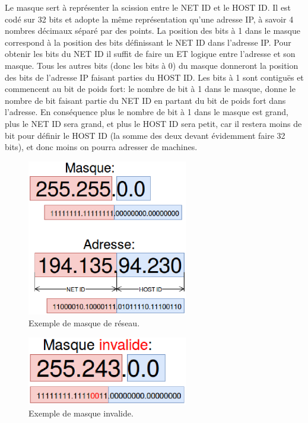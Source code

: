 Le masque sert à représenter la scission entre le NET ID et le HOST ID.
Il est codé sur 32 bits et adopte la même représentation qu'une adresse IP, à savoir
4 nombres décimaux séparé par des points.
La position des bits à 1 dans le masque correspond à la position des bits définissant le NET ID dans l'adresse IP.
Pour obtenir les bits du NET ID il suffit de faire un ET logique entre l'adresse et son masque. Tous les autres bits (donc les bits à 0) du masque donneront la position des bits de l'adresse IP faisant parties du HOST ID.
Les bits à 1 sont contiguës et commencent au bit de poids fort: le nombre de bit à 1 dans le masque, donne
le nombre de bit faisant partie du NET ID en partant du bit de poids fort dans l'adresse.
\smallbreak
En conséquence plus le nombre de bit à 1 dans le masque est grand, plus le NET ID sera grand, et plus le HOST ID sera petit, car il restera moins de bit pour définir le HOST ID (la somme des deux devant évidemment faire 32 bits), et donc moins on pourra adresser de machines.

\begin{figure}[h]
\centering
\includegraphics[width=7cm]{./pics/maskipv4.eps}
\caption{Exemple de masque de réseau.}
\label{fig:exmask}
\end{figure}


\begin{figure}[h]
\centering
\includegraphics[width=7cm]{./pics/maskipv4inv.eps}
\caption{Exemple de masque invalide.}
\label{fig:exmaskin}
\end{figure}


